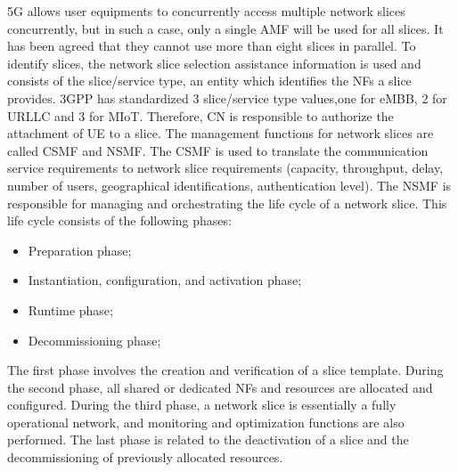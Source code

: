 \documentclass[a4paper,12pt]{report} %
\begin{document}
5G allows user equipments to concurrently
access multiple
network slices concurrently, but in such a
case, only a single AMF will be used for all slices.
It has been agreed that they cannot use more
than eight slices in parallel.
To identify slices, the network slice selection assistance
information is used and consists of
the slice/service type, an entity which identifies the
NFs a slice provides. 3GPP has
standardized 3 slice/service type values,one for eMBB,
2 for URLLC and 3 for MIoT. Therefore, CN
is responsible to authorize the attachment of UE
to a slice.
The management functions for network
slices are called \gls{CSMF} and \gls{NSMF}. The CSMF is used
to translate the communication service requirements
to network slice requirements (capacity,
throughput, delay, number of users, geographical
identifications, authentication level). The
NSMF is responsible for managing and orchestrating
the life cycle of a network slice. This life cycle
consists of the following phases:
\begin{itemize}
\item Preparation phase;

\item Instantiation, configuration, and activation
phase;

\item Runtime phase;

\item Decommissioning phase;

\end{itemize}
The first phase involves the creation and verification
of a slice template. During the second phase,
all shared or dedicated NFs and resources are
allocated and configured. During the third phase,
a network slice is essentially a fully operational
network, and monitoring and optimization functions
are also performed. The last phase is related
to the deactivation of a slice and the decommissioning
of previously allocated resources.
\end{document}
